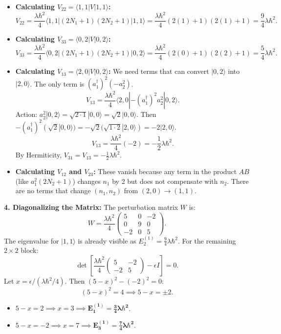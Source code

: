 \begin{solution}
\begin{itemize}
    \item \textbf{Calculating $V_{22} = \langle 1, 1 | V | 1, 1 \rangle$:}
    \[ V_{22} = \frac{\lambda\hbar^2}{4} \langle 1,1 | (2N_1 + 1)(2N_2 + 1) | 1,1 \rangle = \frac{\lambda\hbar^2}{4} (2(1)+1)(2(1)+1) = \frac{9}{4}\lambda\hbar^2. \]

    \item \textbf{Calculating $V_{33} = \langle 0, 2 | V | 0, 2 \rangle$:}
    \[ V_{33} = \frac{\lambda\hbar^2}{4} \langle 0,2 | (2N_1 + 1)(2N_2 + 1) | 0,2 \rangle = \frac{\lambda\hbar^2}{4} (2(0)+1)(2(2)+1) = \frac{5}{4}\lambda\hbar^2. \]

    \item \textbf{Calculating $V_{13} = \langle 2, 0 | V | 0, 2 \rangle$:}
    We need terms that can convert $|0, 2\rangle$ into $|2, 0\rangle$. The only term is $(a_1^\dagger)^2 (-a_2^2)$.
    \[ V_{13} = \frac{\lambda\hbar^2}{4} \langle 2,0 | -(a_1^\dagger)^2 a_2^2 | 0,2 \rangle. \]
    Action: $a_2^2 |0, 2\rangle = \sqrt{2 \cdot 1} |0, 0\rangle = \sqrt{2} |0, 0\rangle$. 
    Then $-(a_1^\dagger)^2 (\sqrt{2} |0, 0\rangle) = -\sqrt{2} (\sqrt{1 \cdot 2} |2, 0\rangle) = -2 |2, 0\rangle$.
    \[ V_{13} = \frac{\lambda\hbar^2}{4} (-2) = -\frac{1}{2}\lambda\hbar^2. \]
    By Hermiticity, $V_{31} = V_{13} = -\frac{1}{2}\lambda\hbar^2$.

    \item \textbf{Calculating $V_{12}$ and $V_{23}$:}
    These vanish because any term in the product $AB$ (like $a_1^2 (2N_2+1)$) changes $n_1$ by 2 but does not compensate with $n_2$. There are no terms that change $(n_1, n_2)$ from $(2,0) \to (1,1)$.
\end{itemize}

\textbf{4. Diagonalizing the Matrix:}
The perturbation matrix $W$ is:
\[ W = \frac{\lambda\hbar^2}{4} \begin{pmatrix} 5 & 0 & -2 \\ 0 & 9 & 0 \\ -2 & 0 & 5 \end{pmatrix}. \]
The eigenvalue for $|1, 1\rangle$ is already visible as \textbf{$E^{(1)}_2 = \frac{9}{4}\lambda\hbar^2$}.
For the remaining $2 \times 2$ block:
\[ \det \left[ \frac{\lambda\hbar^2}{4} \begin{pmatrix} 5 & -2 \\ -2 & 5 \end{pmatrix} - \epsilon I \right] = 0. \]
Let $x = \epsilon / (\lambda\hbar^2 / 4)$. Then $(5-x)^2 - (-2)^2 = 0$:
\[ (5-x)^2 = 4 \implies 5-x = \pm 2. \]
\begin{itemize}
    \item $5-x = 2 \implies x = 3 \implies \mathbf{E^{(1)}_1 = \frac{3}{4}\lambda\hbar^2}$.
    \item $5-x = -2 \implies x = 7 \implies \mathbf{E^{(1)}_3 = \frac{7}{4}\lambda\hbar^2}$.
\end{itemize}


\end{solution}
